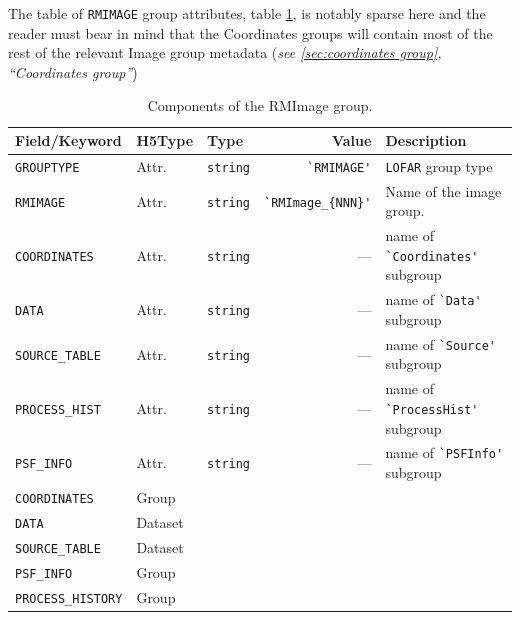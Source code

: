 \documentclass[a4paper,10pt,bibtotoc]{scrartcl}
\begin{document}
The table of \texttt{RMIMAGE} group attributes, table \ref{tab:RMImage group Attributes}, is notably sparse here and the reader must bear in mind that the Coordinates groups will contain most of the rest of the relevant Image group metadata (\textit{see \ref{sec:coordinates group}, ``Coordinates group''})

\begin{table}[ht]
  \centering
  \begin{tabular}{|lllrl|}
    \hline
    \sc Field/Keyword & \sc H5Type & \sc Type & Value &\sc Description \\
    \hline \hline
    \small\verb|GROUPTYPE|    & Attr. 
                              & \small\verb|string|
                              & \verb|`RMIMAGE'|
                              & \small{\texttt{LOFAR}} group type \\
    \small\verb|RMIMAGE|      & Attr.
                              & \small\verb|string|
                              & \verb|`RMImage_{NNN}'|
                              & Name of the image group. \\ 
    \small\verb|COORDINATES|  & Attr.
                              & \small\verb|string|
                              & ---
                              & name of \verb|`Coordinates'| subgroup  \\
    \small\verb|DATA|         & Attr.
                              & \small\verb|string|
                              & ---
                              & name of \verb|`Data'| subgroup \\
    \small\verb|SOURCE_TABLE| & Attr.
                              & \small\verb|string|
                              & ---
                              & name of \verb|`Source'| subgroup \\
    \small\verb|PROCESS_HIST| & Attr.
                              & \small\verb|string|
                              & ---
                              & name of \verb|`ProcessHist'| subgroup \\  
    \small\verb|PSF_INFO|     & Attr.
                              & \small\verb|string|
                              & ---
                              & name of \verb|`PSFInfo'| subgroup \\
    \hline \hline
    \small\verb|COORDINATES|     & Group \\
    \small\verb|DATA|            & Dataset \\
    \small\verb|SOURCE_TABLE|    & Dataset \\
    \small\verb|PSF_INFO|        & Group \\
    \small\verb|PROCESS_HISTORY| & Group \\
    \hline
  \end{tabular}
  \label{tab:RMImage group Attributes}
  \caption{Components of the RMImage group.}
\end{table}
\end{document}
